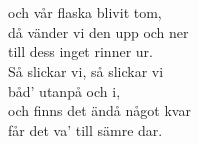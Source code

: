 
 \\       

\\
och vår flaska blivit tom,\\
då vänder vi den upp och ner\\
till dess inget rinner ur.\\
\leftrepeat Så slickar vi, så slickar vi\\
båd' utanpå och i,\\
och finns det ändå något kvar\\
får det va' till sämre dar. \rightrepeat

